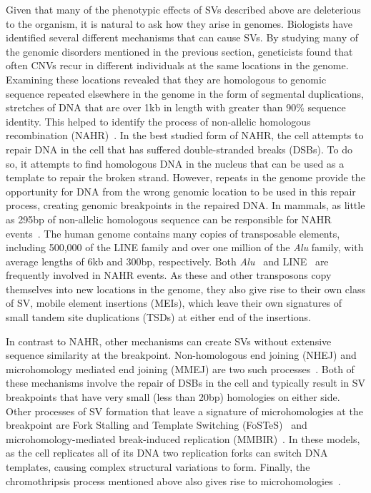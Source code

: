 Given that many of the phenotypic effects of SVs described above are deleterious to the organism, it is natural to ask how they arise in genomes. Biologists have identified several different mechanisms that can cause SVs. By studying many of the genomic disorders mentioned in the previous section, geneticists found that often CNVs recur in different individuals at the same locations in the genome. Examining these locations revealed that they are homologous to genomic sequence repeated elsewhere in the genome in the form of segmental duplications, stretches of DNA that are over 1kb in length with greater than 90\% sequence identity\cite{Sharp:2006fy}. This helped to identify the process of non-allelic homologous recombination (NAHR)~\cite{Liu:2012if}. In the best studied form of NAHR, the cell attempts to repair DNA in the cell that has suffered double-stranded breaks (DSBs). To do so, it attempts to find homologous DNA in the nucleus that can be used as a template to repair the broken strand. However, repeats in the genome provide the opportunity for DNA from the wrong genomic location to be used in this repair process, creating genomic breakpoints in the repaired DNA. In mammals, as little as 295bp of non-allelic homologous sequence can be responsible for NAHR events~\cite{Liskay:1987wt}. The human genome contains many copies of transposable elements, including 500,000 of the LINE family and over one million of the \emph{Alu} family, with average lengths of 6kb and 300bp, respectively. Both \emph{Alu}~\cite{Lehrman:1985tn} and LINE~\cite{Robberecht:2013kw} are frequently involved in NAHR events. As these and other transposons copy themselves into new locations in the genome, they also give rise to their own class of SV, mobile element insertions (MEIs), which leave their own signatures of small tandem site duplications (TSDs) at either end of the insertions.

In contrast to NAHR, other mechanisms can create SVs without extensive sequence similarity at the breakpoint. Non-homologous end joining (NHEJ) and microhomology mediated end joining (MMEJ) are two such processes~\cite{Hastings:2009fv}. Both of these mechanisms involve the repair of DSBs in the cell and typically result in SV breakpoints that have very small (less than 20bp) homologies on either side. Other processes of SV formation that leave a signature of microhomologies at the breakpoint are Fork Stalling and Template Switching (FoSTeS)~\cite{Lee:2007fy} and microhomology-mediated break-induced replication (MMBIR)~\cite{Hastings:2009fv}. In these models, as the cell replicates all of its DNA two replication forks can switch DNA templates, causing complex structural variations to form. Finally, the chromothripsis process mentioned above also gives rise to microhomologies~\cite{Liu:2011p1751}.

